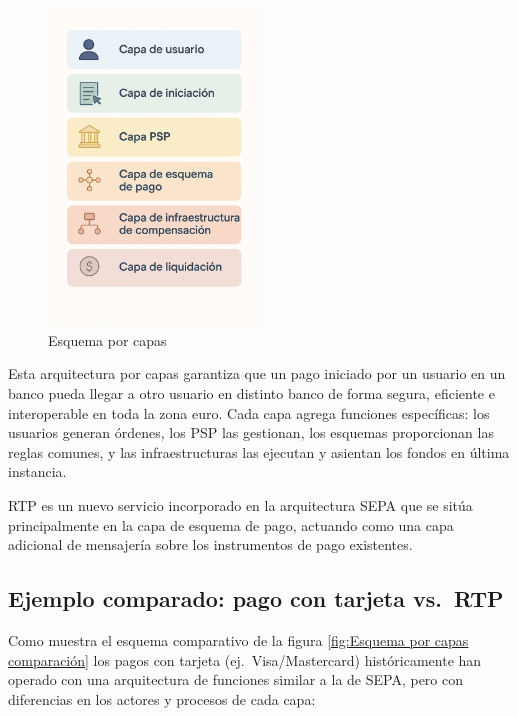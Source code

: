 \begin{figure}[H]
  \centering
  \includegraphics[width=0.5\textwidth]{Imagenes/esq1.png}
  \caption{Esquema por capas}
  \label{fig:Esquema por capas}
\end{figure}

Esta arquitectura por capas garantiza que un pago iniciado por un usuario en un banco pueda llegar a otro usuario en distinto banco de forma segura, eficiente e interoperable en toda la zona euro. Cada capa agrega funciones específicas: los usuarios generan órdenes, los PSP las gestionan, los esquemas proporcionan las reglas comunes, y las infraestructuras las ejecutan y asientan los fondos en última instancia.

RTP es un nuevo servicio incorporado en la arquitectura SEPA que se sitúa principalmente en la capa de esquema de pago, actuando como una capa adicional de mensajería sobre los instrumentos de pago existentes.

\subsection*{Ejemplo comparado: pago con tarjeta vs.\ RTP}

Como muestra el esquema comparativo de la figura \ref{fig:Esquema por capas comparación} los pagos con tarjeta (ej.\ Visa/Mastercard) históricamente han operado con una arquitectura de funciones similar a la de SEPA, pero con diferencias en los actores y procesos de cada capa:

